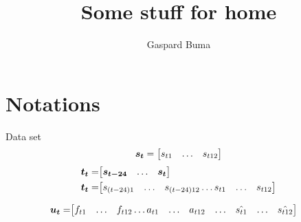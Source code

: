 \documentclass[11pt,twocolumn]{amsart} %
\title{Some stuff for \textbf{home}}
\author{Gaspard Buma}
\newcommand{\ve}[1]{\boldsymbol{#1}}
\newenvironment{m}{\begin{bmatrix}}{\end{bmatrix}}
\begin{document}
\twocolumn[
\maketitle
]
\section{Notations}
Data set
\[
	\ve{s_t} = \begin{m} s_{t1} & \hdots & s_{t12} \end{m}
\]
\begin{align*}
	\ve{t_t} = & \begin{m} \ve{s_{t-24}} & \hdots & \ve{s_t} \end{m} \\
	\ve{t_t} = & \begin{m} s_{(t-24)1} & \hdots & s_{(t-24)12} \hdots s_{t1} & \hdots & s_{t12} \end{m}
\end{align*}

\begin{align*}
	\ve{u_t} = & \begin{m} f_{t1} & \hdots & f_{t12} \hdots a_{t1} & \hdots & a_{t12} & \hdots & \hat{s_{t1}} & \hdots & \hat{s_{t12}} \end{m}
\end{align*}
\end{document}
